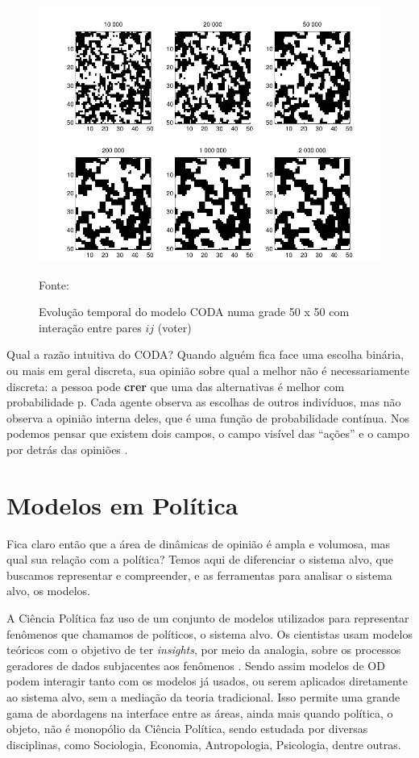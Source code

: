 \begin{figure}[H]
  \centering \includegraphics[scale = 0.7]{ims/andre.png}
  \caption{Evolução temporal do modelo CODA numa grade 50 x 50 com
    interação entre pares $ij$ (voter)}
  Fonte: 
\end{figure}


Qual a razão intuitiva do CODA?  Quando alguém fica face uma escolha
binária, ou mais em geral discreta, sua opinião sobre qual a melhor
não é necessariamente discreta: a pessoa pode \textbf{crer} que uma
das alternativas é melhor com probabilidade p. Cada agente observa as
escolhas de outros indivíduos, mas não observa a opinião interna
deles, que é uma função de probabilidade contínua. Nos podemos pensar
que existem dois campos, o campo visível das ``ações'' e o campo por
detrás das opiniões \cite{martins2008continuous}.


\section{Modelos em Política}

Fica claro então que a área de dinâmicas de opinião é ampla e volumosa, mas qual
sua relação com a política? Temos aqui de diferenciar o sistema alvo, que
buscamos representar e compreender, e as ferramentas para analisar o sistema
alvo, os modelos.


A Ciência Política faz uso de um conjunto de modelos utilizados para representar
fenômenos que chamamos de políticos, o sistema alvo. Os cientistas usam modelos
teóricos com o objetivo de ter \textit{insights}, por meio da analogia, sobre os
processos geradores de dados subjacentes aos fenômenos
\cite{clarke2012model,morton1999methods}. Sendo assim modelos de OD podem
interagir tanto com os modelos já usados, ou serem aplicados diretamente ao
sistema alvo, sem a mediação da teoria tradicional. Isso permite uma grande gama
de abordagens na interface entre as áreas, ainda mais quando política, o objeto,
não é monopólio da Ciência Política, sendo estudada por diversas disciplinas,
como Sociologia, Economia, Antropologia, Psicologia, dentre outras.



